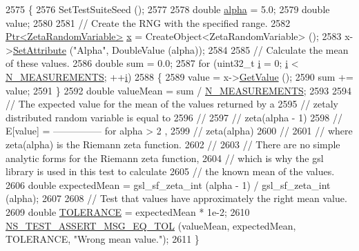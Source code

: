 \begin{DoxyCode}
2575 \{
2576   SetTestSuiteSeed ();
2577 
2578   \textcolor{keywordtype}{double} \hyperlink{lte__uplink__power__control_8m_a62197192f0fbf4e0675eb37be1c4c175}{alpha} = 5.0;
2579   \textcolor{keywordtype}{double} value;
2580 
2581   \textcolor{comment}{// Create the RNG with the specified range.}
2582   \hyperlink{classns3_1_1Ptr}{Ptr<ZetaRandomVariable>} \hyperlink{lte__link__budget__x2__handover__measures_8m_a9336ebf25087d91c818ee6e9ec29f8c1}{x} = CreateObject<ZetaRandomVariable> ();
2583   x->\hyperlink{classns3_1_1ObjectBase_ac60245d3ea4123bbc9b1d391f1f6592f}{SetAttribute} (\textcolor{stringliteral}{"Alpha"}, DoubleValue (alpha));
2584 
2585   \textcolor{comment}{// Calculate the mean of these values.}
2586   \textcolor{keywordtype}{double} sum = 0.0;
2587   \textcolor{keywordflow}{for} (uint32\_t \hyperlink{bernuolliDistribution_8m_a6f6ccfcf58b31cb6412107d9d5281426}{i} = 0; \hyperlink{bernuolliDistribution_8m_a6f6ccfcf58b31cb6412107d9d5281426}{i} < \hyperlink{classRandomVariableStreamZetaTestCase_a40f8e66ab80fb024916ce61573e37b41}{N\_MEASUREMENTS}; ++\hyperlink{bernuolliDistribution_8m_a6f6ccfcf58b31cb6412107d9d5281426}{i})
2588     \{
2589       value = x->\hyperlink{classns3_1_1ZetaRandomVariable_a8ab47b42912943fe4eea82bdd250d42a}{GetValue} ();
2590       sum += value;
2591     \}
2592   \textcolor{keywordtype}{double} valueMean = sum / \hyperlink{classRandomVariableStreamZetaTestCase_a40f8e66ab80fb024916ce61573e37b41}{N\_MEASUREMENTS};
2593 
2594   \textcolor{comment}{// The expected value for the mean of the values returned by a}
2595   \textcolor{comment}{// zetaly distributed random variable is equal to }
2596   \textcolor{comment}{//}
2597   \textcolor{comment}{//                   zeta(alpha - 1)}
2598   \textcolor{comment}{//     E[value]  =  ---------------   for alpha > 2 ,}
2599   \textcolor{comment}{//                     zeta(alpha)}
2600   \textcolor{comment}{//                          }
2601   \textcolor{comment}{// where zeta(alpha) is the Riemann zeta function.}
2602   \textcolor{comment}{//                 }
2603   \textcolor{comment}{// There are no simple analytic forms for the Riemann zeta function,}
2604   \textcolor{comment}{// which is why the gsl library is used in this test to calculate}
2605   \textcolor{comment}{// the known mean of the values.}
2606   \textcolor{keywordtype}{double} expectedMean = gsl\_sf\_zeta\_int (alpha - 1) / gsl\_sf\_zeta\_int (alpha);
2607 
2608   \textcolor{comment}{// Test that values have approximately the right mean value.}
2609   \textcolor{keywordtype}{double} \hyperlink{spectrum-value-test_8cc_a30c17564229ec2e37dfea9c6c9ad643e}{TOLERANCE} = expectedMean * 1e-2;
2610   \hyperlink{group__testing_ga9e7861b56b4e70db3b56044cb7a28e41}{NS\_TEST\_ASSERT\_MSG\_EQ\_TOL} (valueMean, expectedMean, TOLERANCE, \textcolor{stringliteral}{"Wrong mean
       value."}); 
2611 \}
\end{DoxyCode}


